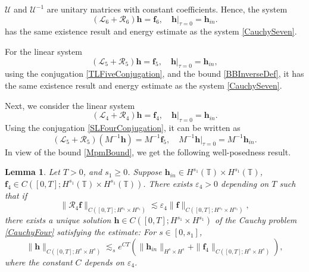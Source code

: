 \documentclass[12pt]{amsart}
\newtheorem{lemma}[theorem]{Lemma}
\theoremstyle{remark}
\theoremstyle{definition}
\numberwithin{equation}{section}
\newcommand{\T}{{\mathbb T}}
\newcommand{\mL}{\mathcal{L}}
\newcommand{\mR}{\mathcal{R}}
\newcommand{\mU}{\mathcal{U}}
\begin{document}
$\mU$ and $\mU^{-1}$ are unitary matrices with constant coefficients.
Hence, the system
\begin{equation*} 
  (\mL_6 + \mR_6)\mathbf{h} = \mathbf{f}_6, \quad \mathbf{h}|_{\tau=0} = \mathbf{h}_{in}. 
\end{equation*}
has the same existence result and energy estimate as the system \eqref{CauchySeven}.

For the linear system 
\begin{equation*} 
  (\mL_5 + \mR_5) \mathbf{h} = \mathbf{f}_5, \quad \mathbf{h}|_{\tau=0} = \mathbf{h}_{in},
\end{equation*}
using the conjugation \eqref{TLFiveConjugation}, and the bound 
\eqref{BBInverseDef}, it has the same existence result and energy estimate as the system \eqref{CauchySeven}.

Next, we consider the linear system 
\begin{equation} \label{CauchyFour}
  (\mL_4 + \mR_4) \mathbf{h} = \mathbf{f}_4, \quad \mathbf{h}|_{\tau=0} = \mathbf{h}_{in}.
\end{equation}
Using the conjugation \eqref{SLFourConjugation}, it can be written as
\begin{equation*} 
 (\mL_5 + \mR_5) (M^{-1}\mathbf{h}) = M^{-1}\mathbf{f}_5, \quad M^{-1}\mathbf{h}|_{\tau=0} = M^{-1}\mathbf{h}_{in}.  
\end{equation*}
In view of the bound \eqref{MpmBound}, we get the following well-posedness result.
\begin{lemma} \label{t:CauchyFour}
Let $T>0$, and $s_1\geq 0$.
Suppose $\mathbf{h}_{in} \in H^{s_1}(\T)\times H^{s_1}(\T)$, $\mathbf{f}_4\in C([0,T];H^{s_1}(\T)\times H^{s_1}(\T))$.
There exists $\varepsilon_4>0$ depending on $T$ such that if 
\begin{equation*}
 \|\mR_4 \mathbf{f} \|_{C([0,T];H^{s_1}\times H^{s_1})} \lesssim \varepsilon_4 \|\mathbf{f}\|_{C([0,T];H^{s_1}\times H^{s_1})},
\end{equation*}
there exists a unique solution $\mathbf{h}\in C([0,T];H^{s_1}\times H^{s_1})$ of the Cauchy problem \eqref{CauchyFour} satisfying the estimate:
For $s\in [0, s_1]$, 
\begin{equation} \label{mR4EnergyEst}
 \| \mathbf{h}\|_{C([0,T]; H^s\times H^s)} \lesssim_s e^{CT}\left(\|\mathbf{h}_{in} \|_{H^s\times H^s} + \| \mathbf{f}_4\|_{C([0,T]; H^s\times H^s)}\right),  
\end{equation}
where the constant $C$ depends on $\varepsilon_4$.
\end{lemma}
\end{document}
